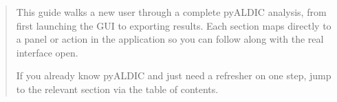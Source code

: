 


\maketitle
\thispagestyle{empty}

\begin{abstract}
\noindent
This guide walks a new user through a complete pyALDIC analysis,
from first launching the GUI to exporting results. Each section maps
directly to a panel or action in the application so you can follow
along with the real interface open.

If you already know pyALDIC and just need a refresher on one step,
jump to the relevant section via the table of contents.
\end{abstract}

\tableofcontents
\newpage

















